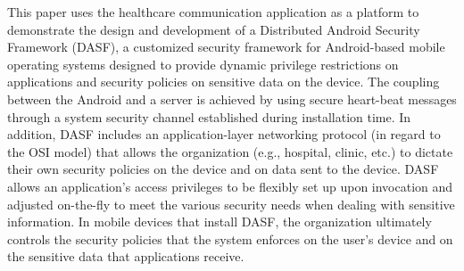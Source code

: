 This paper uses the healthcare communication application as a platform to
demonstrate the design and development of a Distributed Android Security
Framework (DASF), a customized security framework for Android-based mobile
operating systems designed to provide dynamic privilege restrictions on
applications and security policies on sensitive data on the device. The
coupling between the Android and a server is achieved by using secure
heart-beat messages through a system security channel established during
installation time.  In addition, DASF includes an application-layer networking
protocol (in regard to the OSI model) that allows the organization (e.g.,
hospital, clinic, etc.) to dictate their own security policies on the device
and on data sent to the device. DASF allows an application's access privileges
to be flexibly set up upon invocation and adjusted on-the-fly to meet the
various security needs when dealing with sensitive information. In mobile
devices that install DASF, the organization ultimately controls the security
policies that the system enforces on the user's device and on the sensitive
data that applications receive.

\begin{comment}
Therefore, the contributions that this paper provides are as
follows.  First, this paper provides a security policy
for dynamic system-wide privilege restrictions to be
enforced on applications.  Second, this paper also provides
a security policy that can be enforced on sensitive data.
The aforementioned security policies can either be utilized
by a server communicating with the mobile device or 
by a developer who is creating an application.
\end{comment}


